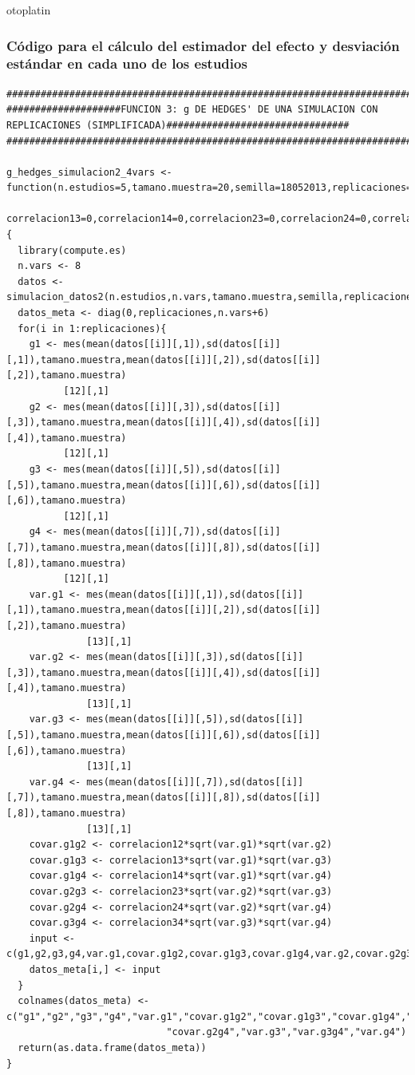 otoplatin\documentclass[a4paper,openright,12pt]{report}
\begin{document}
\subsubsection{Código para el cálculo del estimador del efecto y desviación estándar en cada uno de los estudios}
{\tiny
\begin{verbatim}
##############################################################################################################################
####################FUNCION 3: g DE HEDGES' DE UNA SIMULACION CON REPLICACIONES (SIMPLIFICADA)################################
##############################################################################################################################

g_hedges_simulacion2_4vars <- function(n.estudios=5,tamano.muestra=20,semilla=18052013,replicaciones=5,correlacion12=0,
                                       correlacion13=0,correlacion14=0,correlacion23=0,correlacion24=0,correlacion34=0){
  library(compute.es)
  n.vars <- 8
  datos <- simulacion_datos2(n.estudios,n.vars,tamano.muestra,semilla,replicaciones) 
  datos_meta <- diag(0,replicaciones,n.vars+6)
  for(i in 1:replicaciones){
    g1 <- mes(mean(datos[[i]][,1]),sd(datos[[i]][,1]),tamano.muestra,mean(datos[[i]][,2]),sd(datos[[i]][,2]),tamano.muestra)
          [12][,1]
    g2 <- mes(mean(datos[[i]][,3]),sd(datos[[i]][,3]),tamano.muestra,mean(datos[[i]][,4]),sd(datos[[i]][,4]),tamano.muestra)
          [12][,1]
    g3 <- mes(mean(datos[[i]][,5]),sd(datos[[i]][,5]),tamano.muestra,mean(datos[[i]][,6]),sd(datos[[i]][,6]),tamano.muestra)
          [12][,1]
    g4 <- mes(mean(datos[[i]][,7]),sd(datos[[i]][,7]),tamano.muestra,mean(datos[[i]][,8]),sd(datos[[i]][,8]),tamano.muestra)
          [12][,1]
    var.g1 <- mes(mean(datos[[i]][,1]),sd(datos[[i]][,1]),tamano.muestra,mean(datos[[i]][,2]),sd(datos[[i]][,2]),tamano.muestra)
              [13][,1]
    var.g2 <- mes(mean(datos[[i]][,3]),sd(datos[[i]][,3]),tamano.muestra,mean(datos[[i]][,4]),sd(datos[[i]][,4]),tamano.muestra)
              [13][,1]
    var.g3 <- mes(mean(datos[[i]][,5]),sd(datos[[i]][,5]),tamano.muestra,mean(datos[[i]][,6]),sd(datos[[i]][,6]),tamano.muestra)
              [13][,1]
    var.g4 <- mes(mean(datos[[i]][,7]),sd(datos[[i]][,7]),tamano.muestra,mean(datos[[i]][,8]),sd(datos[[i]][,8]),tamano.muestra)
              [13][,1]
    covar.g1g2 <- correlacion12*sqrt(var.g1)*sqrt(var.g2)
    covar.g1g3 <- correlacion13*sqrt(var.g1)*sqrt(var.g3)
    covar.g1g4 <- correlacion14*sqrt(var.g1)*sqrt(var.g4)
    covar.g2g3 <- correlacion23*sqrt(var.g2)*sqrt(var.g3)
    covar.g2g4 <- correlacion24*sqrt(var.g2)*sqrt(var.g4)
    covar.g3g4 <- correlacion34*sqrt(var.g3)*sqrt(var.g4)
    input <- c(g1,g2,g3,g4,var.g1,covar.g1g2,covar.g1g3,covar.g1g4,var.g2,covar.g2g3,covar.g2g4,var.g3,covar.g3g4,var.g4)
    datos_meta[i,] <- input
  }
  colnames(datos_meta) <- c("g1","g2","g3","g4","var.g1","covar.g1g2","covar.g1g3","covar.g1g4","var.g2","covar.g2g3",
                            "covar.g2g4","var.g3","var.g3g4","var.g4")
  return(as.data.frame(datos_meta))
}


\end{verbatim}}
\end{document}
